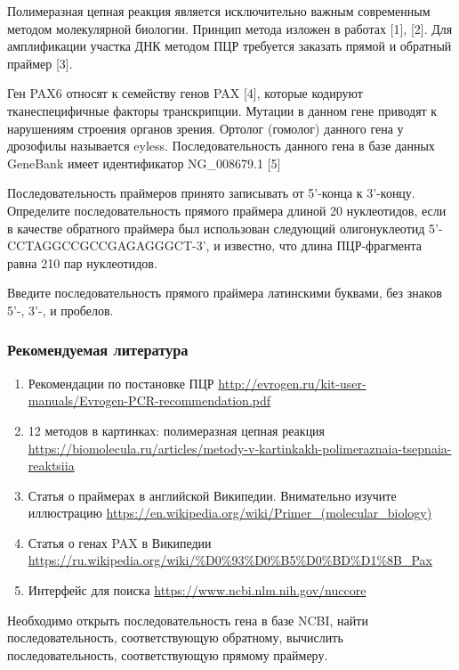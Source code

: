 
Полимеразная цепная реакция является исключительно важным современным методом молекулярной биологии. 
Принцип метода изложен в работах [1], [2]. Для амплификации участка ДНК методом ПЦР требуется заказать 
прямой и обратный праймер [3].

Ген PAX6 относят к семейству генов PAX [4], которые кодируют тканеспецифичные факторы транскрипции. 
Мутации в данном гене приводят к нарушениям строения органов зрения. Ортолог (гомолог) данного гена 
у дрозофилы называется eyless. Последовательность данного гена в базе данных GeneBank имеет идентификатор
 NG\_008679.1 [5]

Последовательность праймеров принято записывать от 5'-конца к 3'-концу. Определите последовательность прямого праймера длиной 20 нуклеотидов, если в качестве обратного праймера был использован следующий \linebreak олигонуклеотид 5'- CCTAGGCCGCCGAGAGGGCT-3', и известно, что длина ПЦР-фрагмента равна 210 пар нуклеотидов.

Введите последовательность прямого праймера латинскими буквами, без знаков 5'-, 3'-, и пробелов.

\subsubsection*{Рекомендуемая литература}

\begin{enumerate}
    \item Рекомендации по постановке ПЦР \url{http://evrogen.ru/kit-user-manuals/Evrogen-PCR-recommendation.pdf}
    \item 12 методов в картинках: полимеразная цепная реакция \url{https://biomolecula.ru/articles/metody-v-kartinkakh-polimeraznaia-tsepnaia-reaktsiia}
    \item Статья о праймерах в английской Википедии. Внимательно изучите иллюстрацию \url{https://en.wikipedia.org/wiki/Primer_(molecular_biology)}
    \item Статья о генах PAX в Википедии \url{https://ru.wikipedia.org/wiki/%D0%93%D0%B5%D0%BD%D1%8B_Pax}
    \item Интерфейс для поиска \url{https://www.ncbi.nlm.nih.gov/nuccore}
\end{enumerate}

\explanationSection

Необходимо открыть последовательность гена в базе NCBI, найти последовательность, соответствующую обратному, вычислить последовательность, соответствующую прямому праймеру.

